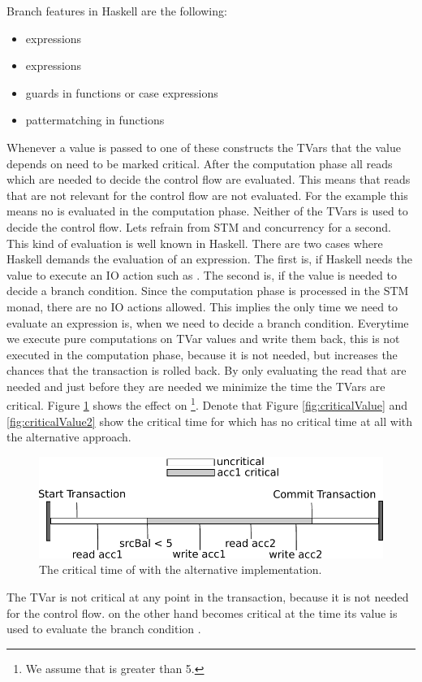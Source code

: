 Branch features in Haskell are the following:
\begin{itemize}
 \item {} expressions
 \item {} expressions
 \item guards in functions or case expressions
 \item pattermatching in functions
\end{itemize}
Whenever a value is passed to one of these constructs the TVars that the value depends on need to be marked critical.
After the computation phase all reads which are needed to decide the control flow are evaluated. 
This means that reads
that are not relevant for the control flow are not evaluated. For the  example this means no 
 is evaluated in the computation phase. Neither of the TVars is used to decide the control 
flow. Lets refrain from STM and concurrency for a second. This kind of evaluation is well known in Haskell. There 
are two cases where Haskell demands the evaluation of an expression. The first is, if Haskell needs the value
to execute an IO action such as . The second is, if the value is needed to decide a branch condition.
Since the computation phase is processed in the STM monad, there are no IO actions allowed.  
This implies the only time we need to evaluate an expression is, when we need to decide a branch condition. 
Everytime we execute pure computations on TVar values and write them back, this is not executed in the computation
phase, because it is not needed, but increases the chances that the transaction is rolled back. By only evaluating
the read that are needed and just before they are needed we minimize the time the TVars are critical. 
Figure \ref{fig:lessCriticalValue} shows the effect on \footnote{We assume that  is greater than 5.}. 
Denote that Figure \ref{fig:criticalValue} and \ref{fig:criticalValue2} show the critical time for 
 which has no critical time at all with the alternative approach.
\begin{figure}
\centering
\includegraphics{Figures/lessCriticalValue}
\decoRule
\caption[lessCriticalValue]{The critical time of  with the alternative implementation.}
\label{fig:lessCriticalValue}
\end{figure}
The TVar  is not critical at any point in the transaction, because it is not needed for the control 
flow.  on the other hand becomes critical at the time its value is used to evaluate the branch
condition .


